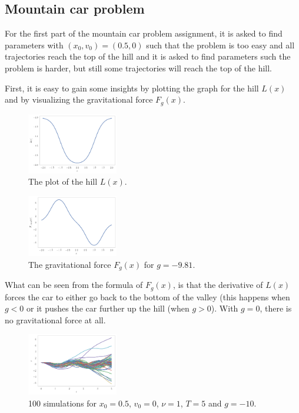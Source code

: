 \documentclass[10pt,a4paper]{article}
\begin{document}
\subsection{Mountain car problem}
For the first part of the mountain car problem assignment, it is asked to find parameters with $(x_0, v_0) = (0.5, 0)$ such that the problem is too easy and all trajectories reach the top of the hill and it is asked to find parameters such the problem is harder, but still some trajectories will reach the top of the hill.

First, it is easy to gain some insights by plotting the graph for the hill $L(x)$ and by visualizing the gravitational force $F_g(x)$.

\begin{figure}[h]
\centering
\includegraphics[width=150px]{lx.png}
\caption{The plot of the hill $L(x)$.}
\label{fig:mcp-fgx}
\end{figure}

\begin{figure}[h]
\centering
\includegraphics[width=150px]{fgx.png}
\caption{The gravitational force $F_g(x)$ for $g=-9.81$.}
\label{fig:mcp-fgx}
\end{figure}

What can be seen from the formula of $F_g(x)$, is that the derivative of $L(x)$ forces the car to either go back to the bottom of the valley (this happens when $g < 0$ or it pushes the car further up the hill (when $g > 0$). With $g = 0$, there is no gravitational force at all.

\begin{figure}[h]
\centering
\includegraphics[width=150px]{sim_g10.png}
\caption{100 simulations for $x_0 = 0.5$, $v_0=0$, $\nu=1$, $T=5$ and $g=-10$.}
\label{fig:mcp-g10}
\end{figure}
\end{document}
